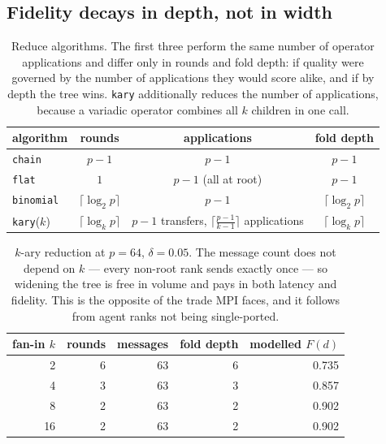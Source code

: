 \documentclass[10pt,twocolumn]{article}
\theoremstyle{definition}
\theoremstyle{plain}
\newcommand{\code}[1]{\texttt{\small #1}}
\begin{document}
\subsection{Fidelity decays in depth, not in width}

\begin{table}[t]
\centering\small
\begin{tabular}{lccc}
\toprule
algorithm & rounds & applications & fold depth \\
\midrule
\code{chain}    & $p-1$                  & $p-1$                 & $p-1$ \\
\code{flat}     & $1$                    & $p-1$ (all at root)   & $p-1$ \\
\code{binomial} & $\lceil\log_2 p\rceil$ & $p-1$                 & $\lceil\log_2 p\rceil$ \\
\code{kary}($k$) & $\lceil\log_k p\rceil$ & $p-1$ transfers, $\lceil\frac{p-1}{k-1}\rceil$ applications & $\lceil\log_k p\rceil$ \\
\bottomrule
\end{tabular}
\caption{Reduce algorithms. The first three perform the same number of operator
applications and differ only in rounds and fold depth: if quality were governed by
the number of applications they would score alike, and if by depth the tree wins.
\code{kary} additionally reduces the number of applications, because a variadic
operator combines all $k$ children in one call.}
\label{tab:reduce-alg}
\end{table}

\begin{table}[t]
\centering\small
\begin{tabular}{rrrrr}
\toprule
fan-in $k$ & rounds & messages & fold depth & modelled $F(d)$ \\
\midrule
2  & 6 & 63 & 6 & 0.735 \\
4  & 3 & 63 & 3 & 0.857 \\
8  & 2 & 63 & 2 & 0.902 \\
16 & 2 & 63 & 2 & 0.902 \\
\bottomrule
\end{tabular}
\caption{$k$-ary reduction at $p=64$, $\delta=0.05$. The message count does not
depend on $k$ --- every non-root rank sends exactly once --- so widening the tree is
free in volume and pays in both latency and fidelity. This is the opposite of the
trade MPI faces, and it follows from agent ranks not being single-ported.}
\label{tab:fanin}
\end{table}
\end{document}

